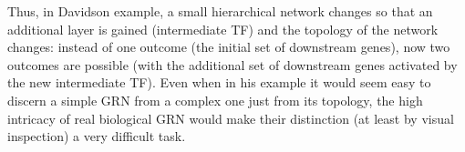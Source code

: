 Thus, in Davidson example, a small hierarchical network changes so that an additional layer is gained (intermediate TF) and the topology of the network changes: instead of one outcome (the initial set of downstream genes), now two outcomes are possible (with the additional set of downstream genes activated by the new intermediate TF).
Even when in his example it would seem easy to discern a simple GRN from a complex one just from its topology, the high intricacy of real biological GRN would make their distinction (at least by visual inspection) a very difficult task.

%
%
%
%
